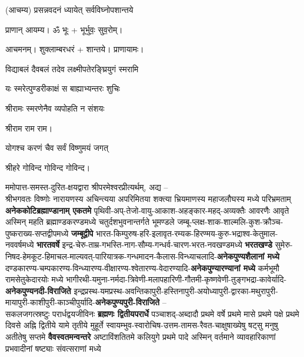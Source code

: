 
\setlength{\parindent}{0pt}

\begin{center}
(आचम्य) 
{प्रसन्नवदनं ध्यायेत् सर्वविघ्नोपशान्तये}
 
प्राणान्  आयम्य।  ॐ भूः + भूर्भुवः॒ सुव॒रोम्।

आचमनम्। शुक्लाम्बरधरं + शान्तये। प्राणायामः।


{विद्याबलं दैवबलं तदेव लक्ष्मीपतेरङ्घ्रियुगं स्मरामि}

{यः स्मरेत्पुण्डरीकाक्षं स बाह्याभ्यन्तरः शुचिः}

{श्रीरामः स्मरणेनैव व्यपोहति न संशयः}

श्रीराम राम राम।

{योगश्च करणं चैव सर्वं विष्णुमयं जगत्}

श्रीहरे गोविन्द गोविन्द गोविन्द।

\end{center}

ममोपात्त-समस्त-दुरित-क्षयद्वारा श्रीपरमेश्वरप्रीत्यर्थम्, अद्य –\\
श्रीभगवतः विष्णोः नारायणस्य अचिन्त्यया अपरिमितया शक्त्या भ्रियमाणस्य महाजलौघस्य मध्ये 
परिभ्रमताम् \textbf{अनेक\-कोटि\-ब्रह्माण्डा\-नाम् एकतमे}
पृथिवी-अप्-तेजो-वायु-आकाश-अहङ्कार-महद्-अव्यक्तैः आवरणैः आवृते अस्मिन् महति ब्रह्माण्डकरण्डमध्ये
चतुर्दशभुवनान्तर्गते भूमण्डले जम्बू-प्लक्ष-शाक-शाल्मलि-कुश-क्रौञ्च-पुष्कराख्य-सप्तद्वीपमध्ये
\textbf{जम्बूद्वीपे} भारत-किम्पुरुष-हरि-इलावृत-रम्यक-हिरण्मय-कुरु-भद्राश्व-केतुमाल-नववर्षमध्ये \textbf{भारतवर्षे}
इन्द्र-चेरु-ताम्र-गभस्ति-नाग-सौम्य-गन्धर्व-चारण-भरत-नवखण्डमध्ये \textbf{भरतखण्डे}
सुमेरु-निषद-हेमकूट-हिमाचल-माल्यवत्-पारियात्रक-गन्धमादन-कैलास-विन्ध्याचलादि-\textbf{अनेक\-पुण्य\-शैलानां मध्ये}
दण्डकारण्य-चम्पकारण्य-विन्ध्यारण्य-वीक्षारण्य-श्वेतारण्य-वेदारण्यादि-\textbf{अनेक\-पुण्या\-रण्यानां मध्ये}
कर्मभूमौ राम\-सेतु\-केदारयोः मध्ये
भागीरथी-यमुना-नर्मदा-त्रिवेणी-मलापहारिणी-गौतमी-कृष्णवेणी-तुङ्गभद्रा-कावेर्यादि-\textbf{अनेक\-पुण्य\-नदी-विराजिते}
इन्द्रप्रस्थ-यमप्रस्थ-अवन्तिका\-पुरी-हस्तिना\-पुरी-अयोध्या\-पुरी-द्वारका-मथुरा\-पुरी-माया\-पुरी-काशी\-पुरी-काञ्ची\-पुर्यादि-\textbf{अनेक\-पुण्य\-पुरी-विराजिते} –\\
सकलजगत्स्रष्टुः परार्धद्वयजीविनः \textbf{ब्रह्मणः द्वितीयपरार्धे} 
पञ्चाशद्-अब्दादौ प्रथमे वर्षे प्रथमे मासे प्रथमे पक्षे प्रथमे दिवसे अह्नि द्वितीये यामे तृतीये मुहूर्ते
स्वायम्भुव-स्वारोचिष-उत्तम-तामस-रैवत-चाक्षुषाख्येषु षट्सु मनुषु अतीतेषु सप्तमे \textbf{वैवस्वतमन्वन्तरे}
अष्टाविंशतितमे कलियुगे प्रथमे पादे अस्मिन् वर्तमाने व्यावहारिकाणां प्रभवादीनां षष्ट्याः संवत्सराणां मध्ये

